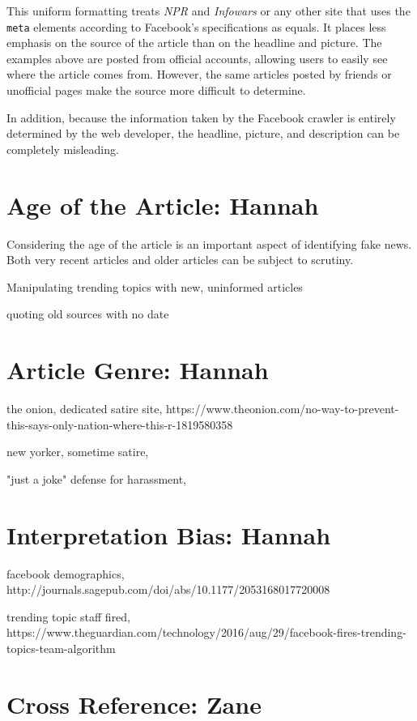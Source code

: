 \documentclass[12pt]{article}
\begin{document}
This uniform formatting treats {\it NPR} and {\it Infowars} or any other site that uses the \texttt{meta} elements according to Facebook's specifications as equals. It places less emphasis on the source of the article than on the headline and picture. The examples above are posted from official accounts, allowing users to easily see where the article comes from. However, the same articles posted by friends or unofficial pages make the source more difficult to determine.

In addition, because the information taken by the Facebook crawler is entirely determined by the web developer, the headline, picture, and description can be completely misleading.






\section{Age of the Article: Hannah}
Considering the age of the article is an important aspect of identifying fake news. Both very recent articles and older articles can be subject to scrutiny.

Manipulating trending topics with new, uninformed articles

quoting old sources with no date



\section{Article Genre: Hannah}

the onion, dedicated satire site, https://www.theonion.com/no-way-to-prevent-this-says-only-nation-where-this-r-1819580358

new yorker, sometime satire, 

"just a joke" defense for harassment, 



\section{Interpretation Bias: Hannah}

facebook demographics, http://journals.sagepub.com/doi/abs/10.1177/2053168017720008

trending topic staff fired, https://www.theguardian.com/technology/2016/aug/29/facebook-fires-trending-topics-team-algorithm



\section{Cross Reference: Zane}
\end{document}
